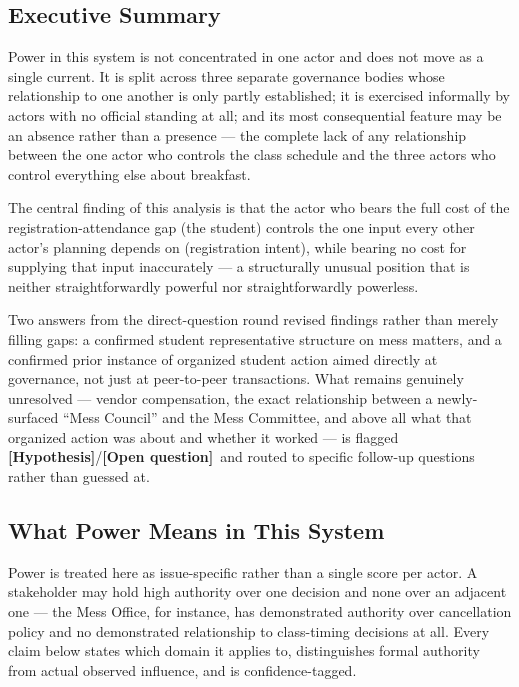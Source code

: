 \documentclass[11pt]{article}
\newcommand{\hypo}{\textbf{[Hypothesis]}}
\newcommand{\openq}{\textbf{[Open question]}}
\begin{document}
\subsection{Executive Summary}

Power in this system is not concentrated in one actor and does not move as a single
current. It is split across three separate governance bodies whose relationship to one
another is only partly established; it is exercised informally by actors with no
official standing at all; and its most consequential feature may be an absence rather
than a presence --- the complete lack of any relationship between the one actor who
controls the class schedule and the three actors who control everything else about
breakfast.

The central finding of this analysis is that the actor who bears the full cost of the
registration-attendance gap (the student) controls the one input every other actor's
planning depends on (registration intent), while bearing no cost for supplying that
input inaccurately --- a structurally unusual position that is neither
straightforwardly powerful nor straightforwardly powerless.

Two answers from the direct-question round revised findings rather than merely filling
gaps: a confirmed student representative structure on mess matters, and a confirmed
prior instance of organized student action aimed directly at governance, not just at
peer-to-peer transactions. What remains genuinely unresolved --- vendor compensation,
the exact relationship between a newly-surfaced ``Mess Council'' and the Mess
Committee, and above all what that organized action was about and whether it worked
--- is flagged \hypo/\openq\ and routed to specific follow-up questions rather than
guessed at.

\subsection{What Power Means in This System}

Power is treated here as issue-specific rather than a single score per actor. A
stakeholder may hold high authority over one decision and none over an adjacent one
--- the Mess Office, for instance, has demonstrated authority over cancellation policy
and no demonstrated relationship to class-timing decisions at all. Every claim below
states which domain it applies to, distinguishes formal authority from actual observed
influence, and is confidence-tagged.
\end{document}
